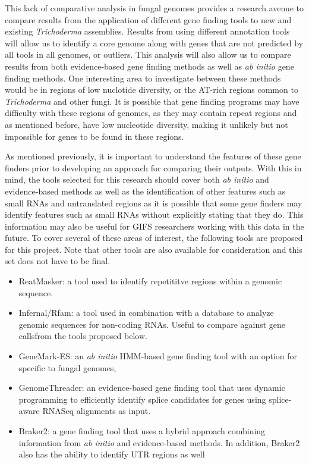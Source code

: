 \documentclass[12pt]{article}
\begin{document}
This lack of comparative analysis in fungal genomes provides a
research avenue to compare results from the application of different
gene finding tools to new and existing \textit{Trichoderma}
assemblies. Results from using different annotation tools will allow
us to identify a core genome along with genes that are not predicted
by all tools in all genomes, or outliers. This analysis will also
allow us to compare results from both evidence-based gene finding
methods as well as \textit{ab initio} gene finding methods. One
interesting area to investigate between these methods would be in
regions of low nuclotide diversity, or the AT-rich regions common to
\textit{Trichoderma} and other fungi. It is possible that gene finding
programs may have difficulty with these regions of genomes, as they
may contain repeat regions and as mentioned before, have low
nucleotide diversity, making it unlikely but not impossible for genes
to be found in these regions.

As mentioned previously, it is important to understand the features of
these gene finders prior to developing an approach for comparing their
outputs. With this in mind, the tools selected for this research
should cover both \textit{ab initio} and evidence-based methods as
well as the identification of other features such as small RNAs and
untranslated regions as it is possible that some gene finders may
identify features such as small RNAs without explicitly stating that
they do. This information may also be useful for GIFS researchers
working with this data in the future. To cover several of these areas
of interest, the following tools are proposed for this project. Note
that other tools are also available for consideration and this set
does not have to be final.

\begin{itemize}

\item ReatMasker\cite{RepeatMasker}: a tool used to identify
  repetititve regions within a genomic sequence.
\item Infernal/Rfam\cite{Infernal}: a tool used in combination with a database to
  analyze genomic sequences for non-coding RNAs. Useful to compare
  against gene callsfrom the tools proposed below.
\item GeneMark-ES\cite{GeneMarkES}: an \textit{ab initio} HMM-based
  gene finding tool with an option for specific to fungal genomes,
\item GenomeThreader\cite{GenomeThreader}: an evidence-based gene finding
  tool that uses dynamic programming to efficiently identify splice
  candidates for genes using splice-aware RNASeq alignments as input.
\item Braker2: a gene finding tool that uses a hybrid approach
  combining information from \textit{ab initio} and evidence-based
  methods. In addition, Braker2 also has the ability to identify UTR
  regions as well

\end{itemize}
\end{document}

